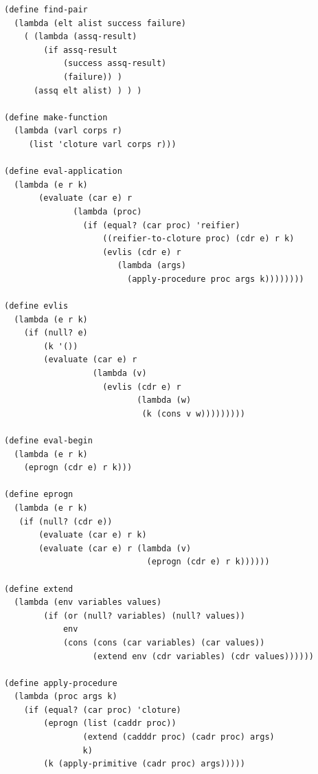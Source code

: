 \documentclass[11pt]{book}
\begin{document}
\begin{footnotesize}
\begin{Verbatim}
(define find-pair
  (lambda (elt alist success failure)
    ( (lambda (assq-result)
        (if assq-result
            (success assq-result)
            (failure)) )
      (assq elt alist) ) ) )

(define make-function
  (lambda (varl corps r)
     (list 'cloture varl corps r)))

(define eval-application
  (lambda (e r k)
       (evaluate (car e) r
              (lambda (proc)
                (if (equal? (car proc) 'reifier)
                    ((reifier-to-cloture proc) (cdr e) r k)
                    (evlis (cdr e) r
                       (lambda (args)
                         (apply-procedure proc args k))))))))

(define evlis
  (lambda (e r k)
    (if (null? e)
        (k '())
        (evaluate (car e) r
                  (lambda (v)
                    (evlis (cdr e) r
                           (lambda (w)
                            (k (cons v w)))))))))

(define eval-begin
  (lambda (e r k)
    (eprogn (cdr e) r k)))

(define eprogn
  (lambda (e r k)
   (if (null? (cdr e))
       (evaluate (car e) r k)
       (evaluate (car e) r (lambda (v)
                             (eprogn (cdr e) r k))))))

(define extend
  (lambda (env variables values)
        (if (or (null? variables) (null? values))
            env
            (cons (cons (car variables) (car values))
                  (extend env (cdr variables) (cdr values))))))
         
(define apply-procedure
  (lambda (proc args k)
    (if (equal? (car proc) 'cloture)
        (eprogn (list (caddr proc))
                (extend (cadddr proc) (cadr proc) args)
                k)
        (k (apply-primitive (cadr proc) args))))) 


\end{Verbatim}
\end{footnotesize}
\end{document}
